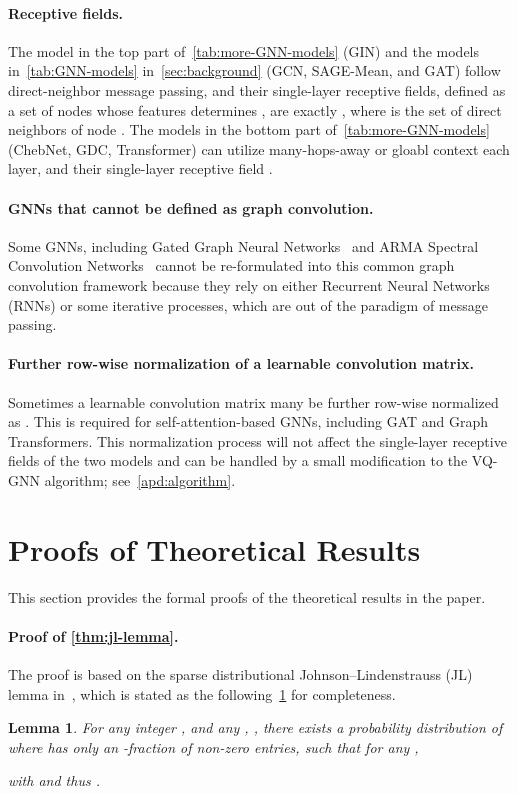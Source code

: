 \documentclass{article}
\newtheorem{lemma}{Lemma}
\newcommand{\cm}{\paragraph}
\begin{document}
\cm{Receptive fields.} The model in the top part of~\cref{tab:more-GNN-models} (GIN) and the models in~\cref{tab:GNN-models} in~\cref{sec:background} (GCN, SAGE-Mean, and GAT) follow direct-neighbor message passing, and their single-layer receptive fields, defined as a set of nodes  whose features  determines , are exactly , where  is the set of direct neighbors of node . The models in the bottom part of~\cref{tab:more-GNN-models} (ChebNet, GDC, Transformer) can utilize many-hops-away or gloabl context each layer, and their single-layer receptive field .

\cm{GNNs that cannot be defined as graph convolution.} Some GNNs, including Gated Graph Neural Networks~\citep{li2015gated} and ARMA Spectral Convolution Networks~\citep{bianchi2021graph} cannot be re-formulated into this common graph convolution framework because they rely on either Recurrent Neural Networks (RNNs) or some iterative processes, which are out of the paradigm of message passing. 

\cm{Further row-wise normalization of a learnable convolution matrix.} Sometimes a learnable convolution matrix many be further row-wise normalized as . This is required for self-attention-based GNNs, including GAT and Graph Transformers. This normalization process will not affect the single-layer receptive fields of the two models and can be handled by a small modification to the VQ-GNN algorithm; see~\cref{apd:algorithm}.



\section{Proofs of Theoretical Results}
\label{apd:proofs}
This section provides the formal proofs of the theoretical results in the paper.

\paragraph{Proof of \texorpdfstring{\cref{thm:jl-lemma}.}{Theorem \ref{thm:jl-lemma}}}
The proof is based on the sparse distributional Johnson–Lindenstrauss (JL) lemma in~\citep{kane2014sparser}, which is stated as the following~\cref{lemma:sparse-jl} for completeness.
\begin{lemma}
\label{lemma:sparse-jl}
For any integer , and any , , there exists a probability distribution of  where  has only an -fraction of non-zero entries, such that for any ,

with  and thus . 
\end{lemma}
\end{document}
